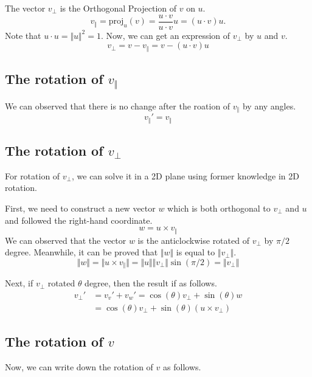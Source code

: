 \documentclass[runningheads,a4paper,english]{llncs}[2022/01/12]
\newcommand{\Clen}[1]{\Vert #1\Vert}
\begin{document}
The vector $v_{\perp}$ is the Orthogonal Projection of $v$ on $u$.
\begin{equation}
  v_{\Vert}=\mathrm{proj}_u(v)
  =\frac{u\cdot v}{u\cdot v}u=(u\cdot v)u.
\end{equation}
Note that $u\cdot u=\Clen{u}^2=1$.
Now, we can get an expression of $v_{\perp}$ by $u$ and $v$.
\begin{equation}\label{vperp_by_v_vvert}
  v_{\perp}=v-v_{\Vert}=v-(u\cdot v)u
\end{equation}

\subsection{The rotation of $v_{\Vert}$}
We can observed that there is no change after the roation of $v_{\Vert}$ by any angles.
\begin{equation}
  v_{\Vert}'=v_{\Vert}
\end{equation}

\subsection{The rotation of $v_{\perp}$}
For rotation of $v_{\perp}$, we can solve it in a 2D plane using former knowledge in 2D rotation.

First, we need to construct a new vector $w$ which is both orthogonal to $v_{\perp}$ and $u$ and followed the right-hand coordinate.
\begin{equation}
  w=u\times v_{\Vert}
\end{equation}
We can observed that the vector $w$ is the anticlockwise rotated of $v_{\perp}$ by $\pi/2$ degree.
Meanwhile, it can be proved that $\Clen{w}$ is equal to $\Clen{v_{\perp}}$.
\begin{equation}
  \Clen{w}=\Clen{u\times v_{\Vert}}=\Clen{u}\Clen{v_{\perp}}\sin(\pi/2)=\Clen{v_{\perp}}
\end{equation}

Next, if $v_{\perp}$ rotated $\theta$ degree, then the result if as follows.
\begin{equation}
  \begin{aligned}
  v_{\perp}'&=v_v'+v_w'=\cos(\theta)v_{\perp}+\sin(\theta)w\\
            &=\cos(\theta)v_{\perp}+\sin(\theta)(u\times v_{\perp})
  \end{aligned}
\end{equation}

\subsection{The rotation of $v$}
Now, we can write down the rotation of $v$ as follows.
\end{document}
